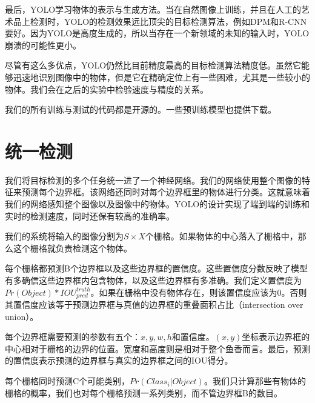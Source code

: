 最后，YOLO学习物体的表示与生成方法。当在自然图像上训练，并且在人工的艺术品上检测时，YOLO的检测效果远比顶尖的目标检测算法，例如DPM和R-CNN要好。因为YOLO是高度生成的，所以当存在一个新领域的未知的输入时，YOLO崩溃的可能性更小。

尽管有这么多优点，YOLO仍然比目前精度最高的目标检测算法精度低。虽然它能够迅速地识别图像中的物体，但是它在精确定位上有一些困难，尤其是一些较小的物体。我们会在之后的实验中检验速度与精度的关系。

我们的所有训练与测试的代码都是开源的。一些预训练模型也提供下载。

\section{统一检测}

我们将目标检测的多个任务统一进了一个神经网络。我们的网络使用整个图像的特征来预测每个边界框。该网络还同时对每个边界框里的物体进行分类。这就意味着我们的网络感知整个图像以及图像中的物体。YOLO的设计实现了端到端的训练和实时的检测速度，同时还保有较高的准确率。

我们的系统将输入的图像分割为$S\times X$个栅格。如果物体的中心落入了栅格中，那么这个栅格就负责检测这个物体。

每个栅格都预测B个边界框以及这些边界框的置信度。这些置信度分数反映了模型有多确信这些边界框内包含物体，以及这些边界框有多准确。我们定义置信度为$Pr(Object)*IOU^{truth}_{pred}$。如果在栅格中没有物体存在，则该置信度应该为0。否则其置信度应该等于预测边界框与真值的边界框的重叠面积占比（intersection over union）。

每个边界框需要预测的参数有五个：$x,y,w,h$和置信度。$(x,y)$坐标表示边界框的中心相对于栅格的边界的位置。宽度和高度则是相对于整个鱼香而言。最后，预测的置信度表示预测的边界框与真实的边界框之间的IOU得分。

每个栅格同时预测C个可能类别，$Pr(Class_i|Object)$。我们只计算那些有物体的栅格的概率，我们也对每个栅格预测一系列类别，而不管边界框B的数目。